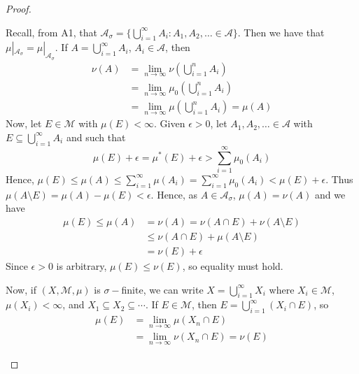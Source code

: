 \documentclass[11pt, a4paper]{memoir}
\theoremstyle{change}
\theoremstyle{plain}
\theoremstyle{nonumberplain}
\newtheorem{proof}{Proof}
\begin{document}
\begin{proof}
\begin{enumerate}[label=(\roman*)]
            Recall, from A1, that $\mathcal{A}_\sigma=\{\bigcup_{i=1}^\infty A_i:A_1,A_2,\ldots\in\mathcal{A}\}$.
            Then we have that $\mu|_{\mathcal{A}_\sigma}=\mu|_{\mathcal{A}_\sigma}$.
            If $A=\bigcup_{i=1}^\infty A_i$, $A_i\in\mathcal{A}$, then
            \begin{align*}
                \nu(A) &= \lim_{n\to\infty} \nu\left(\bigcup_{i=1}^n A_i\right)\\
                       &= \lim_{n\to\infty} \mu_0\left(\bigcup_{i=1}^n A_i\right)\\
                       &= \lim_{n\to\infty}\mu\left(\bigcup_{i=1}^n A_i\right)=\mu(A)
            \end{align*}
            Now, let $E\in\mathcal{M}$ with $\mu(E)<\infty$.
            Given $\epsilon>0$, let $A_1,A_2,\ldots\in\mathcal{A}$ with $E\subseteq\bigcup_{i=1}^\infty A_i$ and such that
            \begin{equation*}
                \mu(E)+\epsilon=\mu^*(E)+\epsilon>\sum\limits_{i=1}^\infty\mu_0(A_i)
            \end{equation*}
            Hence, $\mu(E)\leq\mu(A)\leq\sum_{i=1}^\infty \mu(A_i)=\sum_{i=1}^\infty \mu_0(A_i)<\mu(E)+\epsilon$.
            Thus $\mu(A\setminus E)=\mu(A)-\mu(E)<\epsilon$.
            Hence, as $A\in\mathcal{A}_\sigma$, $\mu(A)=\nu(A)$ and we have
            \begin{align*}
                \mu(E)\leq\mu(A) &= \nu(A)=\nu(A\cap E)+\nu(A\setminus E)\\
                                 &\leq \nu(A\cap E)+\mu(A\setminus E)\\
                                 &= \nu(E)+\epsilon
            \end{align*}
            Since $\epsilon>0$ is arbitrary, $\mu(E)\leq\nu(E)$, so equality must hold.

            Now, if $(X,\mathcal{M},\mu)$ is $\sigma-$finite, we can write $X=\bigcup_{i=1}^\infty X_i$ where $X_i\in\mathcal{M}$, $\mu(X_i)<\infty$, and $X_1\subseteq X_2\subseteq\cdots$.
            If $E\in\mathcal{M}$, then $E=\bigcup_{i=1}^\infty(X_i\cap E)$, so
            \begin{align*}
                \mu(E) &= \lim_{n\to\infty}\mu(X_n\cap E)\\
                       &= \lim_{n\to\infty}\nu(X_n\cap E)=\nu(E)
            \end{align*}
    \end{enumerate}
\end{proof}
\end{document}

